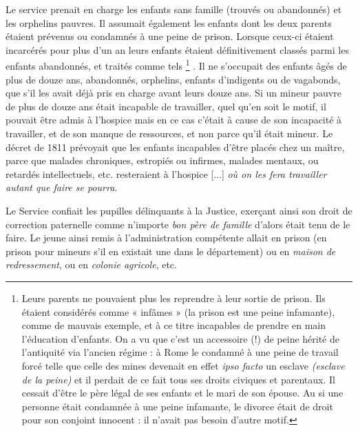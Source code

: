 Le service prenait en charge les enfants sans famille (trouvés ou abandonnés) et les orphelins pauvres. Il assumait également les enfants dont les deux parents étaient prévenus ou condamnés à une peine de prison. Lorsque ceux-ci étaient incarcérés pour plus d'un an leurs enfants étaient définitivement classés parmi les enfants abandonnés, et traités comme tels%
\footnote{Leurs parents ne pouvaient plus les reprendre à leur sortie de prison. Ils étaient considérés comme « infâmes » (la prison est une peine infamante), comme de mauvais exemple, et à ce titre incapables de prendre en main l'éducation d'enfants. On a vu que c'est un accessoire (!) de peine hérité de l'antiquité via l'ancien régime : à Rome le condamné à une peine de travail forcé telle que celle des mines devenait en effet \emph{ipso facto} un esclave \emph{(esclave de la peine)} et il perdait de ce fait tous ses droits civiques et parentaux. Il cessait d'être le père légal de ses enfants et le mari de son épouse. Au  si une personne était condamnée à une peine infamante, le divorce était de droit pour son conjoint innocent : il n'avait pas besoin d'autre motif.}%
. Il ne s'occupait des enfants âgés de plus de douze ans, abandonnés, orphelins, enfants d'indigents ou de vagabonds, que s'il les avait déjà pris en charge avant leurs douze ans. Si un mineur pauvre de plus de douze ans était incapable de travailler, quel qu'en soit le motif, il pouvait être admis à l'hospice mais en ce cas c'était à cause de son incapacité à travailler, et de son manque de ressources, et non parce qu'il était mineur. Le décret de 1811 prévoyait que les enfants incapables d'être placés chez un maître, parce que malades chroniques, estropiés ou infirmes, malades mentaux, ou retardés intellectuels, etc. resteraient à l'hospice [...] \emph{où on les fera travailler autant que faire se pourra}.

 Le Service confiait les pupilles délinquants à la Justice, exerçant ainsi son droit de correction paternelle comme n'importe \emph{bon père de famille} d'alors était tenu de le faire. Le jeune ainsi remis à l'administration compétente allait en prison (en prison pour mineurs s'il en existait une dans le département) ou en \emph{maison de redressement}, ou en \emph{colonie agricole}, etc. 

